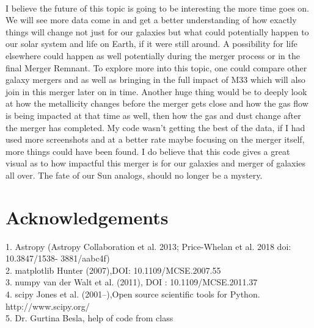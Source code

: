 \documentclass[fleqn,usenatbib]{mnras}
\begin{document}
\paragraph{}

I believe the future of this topic is going to be interesting the more time goes on. We will see more data come in and get a better understanding of how exactly things will change not just for our galaxies but what could potentially happen to our solar system and life on Earth, if it were still around. A possibility for life elsewhere could happen as well potentially during the merger process or in the final Merger Remnant. To explore more into this topic, one could compare other galaxy mergers and as well as bringing in the full impact of M33 which will also join in this merger later on in time. Another huge thing would be to deeply look at how the metallicity changes before the merger gets close and how the gas flow is being impacted at that time as well, then how the gas and dust change after the merger has completed. My code wasn't getting the best of the data, if I had used more screenshots and at a better rate maybe focusing on the merger itself, more things could have been found. I do believe that this code gives a great visual as to how impactful this merger is for our galaxies and merger of galaxies all over. The fate of our Sun analogs, should no longer be a mystery. 

\section{Acknowledgements}

1. Astropy (Astropy Collaboration et al. 2013; Price-Whelan et al. 2018 doi: 10.3847/1538-
3881/aabc4f)
\\
2. matplotlib Hunter (2007),DOI: 10.1109/MCSE.2007.55
\\
3. numpy van der Walt et al. (2011), DOI : 10.1109/MCSE.2011.37
\\
4. scipy Jones et al. (2001–),Open source scientific tools for Python. http://www.scipy.org/
\\
5. Dr. Gurtina Besla, help of code from class









\nocite{*}


\end{document}
